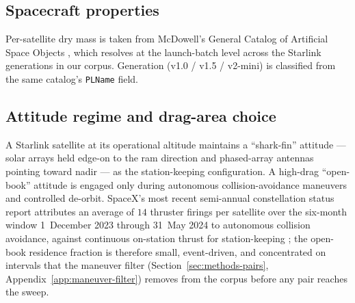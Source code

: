 \documentclass[10pt, letterpaper]{article}
\begin{document}
\subsection{Spacecraft properties}
\label{sec:methods-spacecraft-props}

Per-satellite dry mass is taken from McDowell's General Catalog of
Artificial Space Objects \citep{mcdowell2020}, which resolves at the
launch-batch level across the Starlink generations in our corpus.
Generation (v1.0 / v1.5 / v2-mini) is classified from the same catalog's
\texttt{PLName} field.

\subsection{Attitude regime and drag-area choice}
\label{sec:methods-attitude}

A Starlink satellite at its operational altitude maintains a
``shark-fin'' attitude --- solar arrays held edge-on to the ram
direction and phased-array antennas pointing toward nadir --- as the
station-keeping configuration. A high-drag ``open-book'' attitude is
engaged only during autonomous collision-avoidance maneuvers and
controlled de-orbit. SpaceX's most recent semi-annual constellation
status report \citep{spacex_fcc_semiannual_2024} attributes an average
of $14$ thruster firings per satellite over the six-month window
1~December 2023 through 31~May 2024 to autonomous collision
avoidance, against continuous on-station thrust for station-keeping
\citep{lang2025}; the open-book residence fraction is therefore small,
event-driven, and concentrated on intervals that the maneuver filter
(Section~\ref{sec:methods-pairs}, Appendix~\ref{app:maneuver-filter})
removes from the corpus before any pair reaches the sweep.
\end{document}
